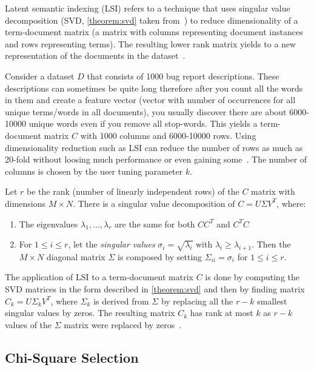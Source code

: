 Latent semantic indexing (LSI) refers to a technique that uses singular value decomposition (SVD, \autoref{theorem:svd} taken from~\cite{manning2008introduction}) to reduce dimensionality of a term-document matrix (a matrix with columns representing document instances and rows representing terms). The resulting lower rank matrix yields to a new representation of the documents in the dataset~\cite{manning2008introduction}.

Consider a dataset $D$ that consists of 1000 bug report descriptions. These descriptions can sometimes be quite long therefore after you count all the words in them and create a feature vector (vector with number of occurrences for all unique terms/words in all documents), you usually discover there are about 6000-10000 unique words even if you remove all stop-words. This yields a term-document matrix $C$ with 1000 columns and 6000-10000 rows. Using dimensionality reduction such as LSI can reduce the number of rows as much as 20-fold without loosing much performance or even gaining some~\cite{Ahsan2009}. The number of columns is chosen by the user tuning parameter $k$.

\begin{theorem}
\label{theorem:svd}
Let $r$ be the rank (number of linearly independent rows) of the $C$ matrix with dimensions $M \times N$. There is a singular value decomposition of $C = U \Sigma V^T$, where:
\begin{enumerate}
    \item The eigenvalues $\lambda_1,...,\lambda_r$ are the same for both $CC^T$ and $C^TC$
    \item For $1 \leq i \leq r$, let the \textit{singular values} $\sigma_i = \sqrt{\lambda_i}$ with $\lambda_i \geq \lambda_{i+1}$. Then the $M \times N$ diagonal matrix $\Sigma$ is composed by setting $\Sigma_{ii} = \sigma_i$ for $1 \leq i \leq r$.
\end{enumerate}
\end{theorem}

The application of LSI to a term-document matrix $C$ is done by computing the SVD matrices in the form described in \autoref{theorem:svd} and then by finding matrix $C_k = U \Sigma_k V^T$, where $\Sigma_k$ is derived from $\Sigma$ by replacing all the $r-k$ smallest singular values by zeros. The resulting matrix $C_k$ has rank at most $k$ as $r-k$ values of the $\Sigma$ matrix were replaced by zeros~\cite{manning2008introduction}.

\subsection{Chi-Square Selection}


